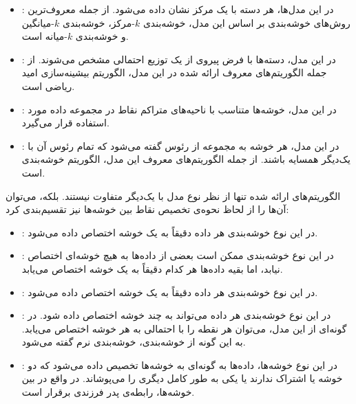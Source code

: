 \begin{itemize}

\item{: در این مدل‌ها، هر دسته با یک مرکز نشان داده می‌شود.
از جمله معروف‌ترین روش‌های خوشه‌بندی بر اساس این مدل،  خوشه‌بندی $k$-مرکز، خوشه‌بندی $k$-میانگین و خوشه‌بندی $k$-میانه است.}

\item{: در این مدل، دسته‌ها با فرض پیروی از یک توزیع احتمالی مشخص می‌شوند.
از جمله الگوریتم‌های معروف ارائه شده در این مدل، الگوریتم بیشینه‌سازی امید ریاضی است.}

\item{: در این مدل، خوشه‌ها متناسب با ناحیه‌های متراکم نقاط در مجموعه داده مورد استفاده قرار می‌گیرد.}

\item{: در این مدل، هر خوشه به مجموعه از رئوس گفته می‌شود که تمام رئوس آن با یک‌دیگر همسایه باشند.
از جمله الگوریتم‌های معروف این مدل، الگوریتم خوشه‌بندی  است.}

\end{itemize}

الگوریتم‌های ارائه شده تنها از نظر نوع مدل با یک‌دیگر متفاوت نیستند.
بلکه، می‌توان آن‌ها را از لحاظ نحوه‌ی تخصیص نقاط بین خوشه‌ها نیز تقسیم‌بندی کرد:

\begin{itemize}

\item{: در این نوع خوشه‌بندی هر داده دقیقاً به یک خوشه اختصاص داده می‌شود.}

\item{: در این نوع خوشه‌بندی ممکن است بعضی از داده‌ها به هیچ خوشه‌ای اختصاص نیابد، اما بقیه داده‌ها هر کدام دقیقاً به یک خوشه اختصاص می‌یابد.}

\item{
	: در این نوع خوشه‌بندی هر داده دقیقاً به یک خوشه اختصاص داده می‌شود.
}

\item{: در این نوع خوشه‌بندی هر داده می‌تواند به چند خوشه اختصاص داده شود.
در گونه‌ای از این مدل، می‌توان هر نقطه را با احتمالی به هر خوشه اختصاص می‌یابد.
به این گونه از خوشه‌بندی، خوشه‌بندی نرم گفته می‌شود.}

\item{: در این نوع خوشه‌ها، داده‌ها به گونه‌ای به خوشه‌ها تخصیص داده می‌شود که دو خوشه یا اشتراک ندارند یا یکی به طور کامل دیگری را می‌پوشاند.
در واقع در بین خوشه‌ها، رابطه‌ی پدر فرزندی برقرار است.}

\end{itemize}

